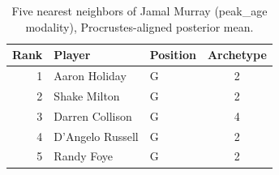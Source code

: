 \begin{table}[htbp]
  \centering\small
  \begin{tabular}{rllc}
    \toprule
    Rank & Player & Position & Archetype \\
    \midrule
    1 & Aaron Holiday & G & 2 \\
    2 & Shake Milton & G & 2 \\
    3 & Darren Collison & G & 4 \\
    4 & D'Angelo Russell & G & 2 \\
    5 & Randy Foye & G & 2 \\
    \bottomrule
  \end{tabular}
  \caption{Five nearest neighbors of Jamal Murray (peak_age modality), Procrustes-aligned posterior mean.}
  \label{tab:Jamal_Murray_neighbors_peak_age}
\end{table}

